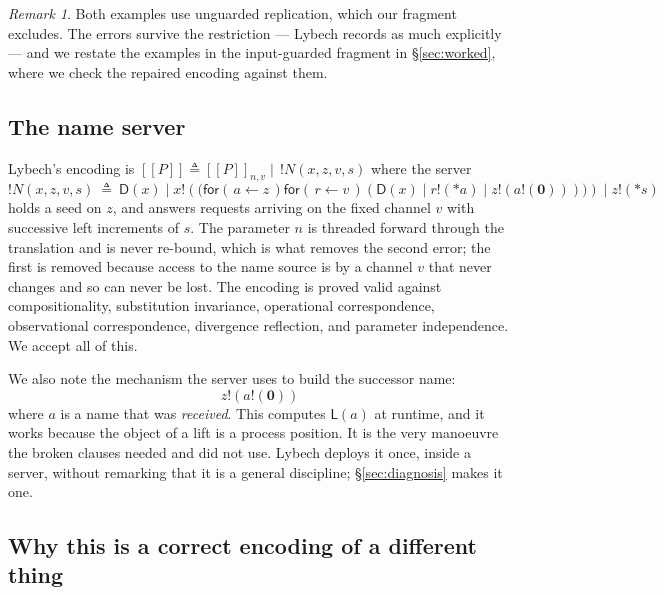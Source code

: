 \documentclass[11pt]{article}
\theoremstyle{definition}
\theoremstyle{plain}
\theoremstyle{remark}
\newtheorem{remark}[definition]{Remark}
\newcommand{\drp}[1]{{*}#1}
\newcommand{\inp}[3]{\mathsf{for}(\,#1 \leftarrow #2\,)#3}
\newcommand{\out}[2]{#1!(#2)}
\newcommand{\enc}[1]{[\![#1]\!]}
\newcommand{\nil}{\mathbf{0}}
\newcommand{\Lft}{\mathsf{L}}
\newcommand{\Dup}{\mathsf{D}}
\begin{document}
\begin{remark}\label{rem:guarded}
Both examples use unguarded replication, which our fragment excludes. The
errors survive the restriction --- Lybech records as much explicitly ---
and we restate the examples in the input-guarded fragment in
\S\ref{sec:worked}, where we check the repaired encoding against them.
\end{remark}

\subsection{The name server}

Lybech's encoding is
$\enc{P} \triangleq \enc{P}_{n,v} \mid\, !N(x,z,v,s)$ where the server
\[
  !N(x,z,v,s) \ \triangleq\
  \Dup(x) \mid \out{x}{\big(\inp{a}{z}{\inp{r}{v}{(\Dup(x) \mid \out{r}{\drp{a}} \mid \out{z}{\out{a}{\nil}})}}\big)}
  \mid \out{z}{\drp{s}}
\]
holds a seed on $z$, and answers requests arriving on the fixed channel
$v$ with successive left increments of $s$. The parameter $n$ is
threaded forward through the translation and is never re-bound, which is
what removes the second error; the first is removed because access to the
name source is by a channel $v$ that never changes and so can never be
lost. The encoding is proved valid against compositionality, substitution
invariance, operational correspondence, observational correspondence,
divergence reflection, and parameter independence. We accept all of
this.

We also note the mechanism the server uses to build the successor name:
\[
  \out{z}{\out{a}{\nil}}
\]
where $a$ is a name that was \emph{received}. This computes
$\Lft(a)$ at runtime, and it works because the object of a lift is a
process position. It is the very manoeuvre the broken clauses needed and
did not use. Lybech deploys it once, inside a server, without remarking
that it is a general discipline; \S\ref{sec:diagnosis} makes it one.

\subsection{Why this is a correct encoding of a different thing}
\end{document}
